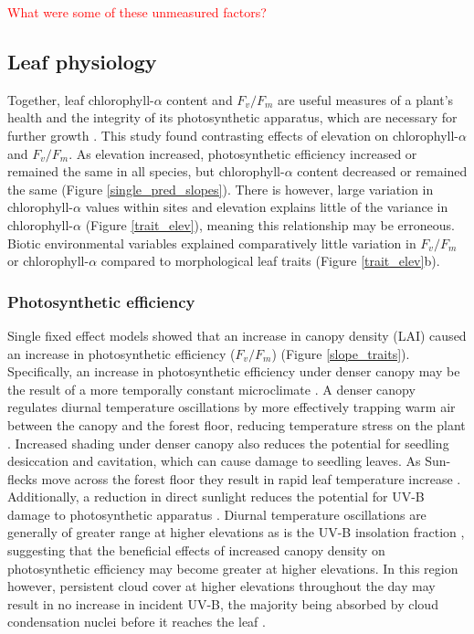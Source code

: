\documentclass[a4paper, 11pt]{article}
\newcommand{\todo}[1]{\textcolor{red}{#1}}   %
\begin{document}
\todo{What were some of these unmeasured factors?}

\subsection*{Leaf physiology}
Together, leaf chlorophyll-$\alpha$ content and $F_v/F_m$ are useful measures of a plant's health and the integrity of its photosynthetic apparatus, which are necessary for further growth \citep{Clark2000}. This study found contrasting effects of elevation on chlorophyll-$\alpha$ and $F_v/F_m$. As elevation increased, photosynthetic efficiency increased or remained the same in all species, but chlorophyll-$\alpha$ content decreased or remained the same (Figure \ref{single_pred_slopes}). There is however, large variation in chlorophyll-$\alpha$ values within sites and elevation explains little of the variance in chlorophyll-$\alpha$ (Figure \ref{trait_elev}), meaning this relationship may be erroneous. Biotic environmental variables explained comparatively little variation in $F_v/F_m$ or chlorophyll-$\alpha$ compared to morphological leaf traits (Figure \ref{trait_elev}b).

\subsubsection*{Photosynthetic efficiency}

Single fixed effect models showed that an increase in canopy density (LAI) caused an increase in photosynthetic efficiency ($F_v/F_m$) (Figure \ref{slope_traits}). Specifically, an increase in photosynthetic efficiency under denser canopy may be the result of a more temporally constant microclimate \citep{Amissah2015}. A denser canopy regulates diurnal temperature oscillations by more effectively trapping warm air between the canopy and the forest floor, reducing temperature stress on the plant \citep{Larcher2003}. Increased shading under denser canopy also reduces the potential for seedling desiccation and cavitation, which can cause damage to seedling leaves. As Sun-flecks move across the forest floor they result in rapid leaf temperature increase \citep{Rozendaal2006, Poorter2010}. Additionally, a reduction in direct sunlight reduces the potential for UV-B damage to photosynthetic apparatus \citep{Dobrikova2013}. Diurnal temperature oscillations are generally of greater range at higher elevations \citep{Seidel2005} as is the UV-B insolation fraction \citep{Piazena1996}, suggesting that the beneficial effects of increased canopy density on photosynthetic efficiency may become greater at higher elevations. In this region however, persistent cloud cover at higher elevations throughout the day may result in no increase in incident UV-B, the majority being absorbed by cloud condensation nuclei before it reaches the leaf \citep{Flint2003}.
\end{document}

